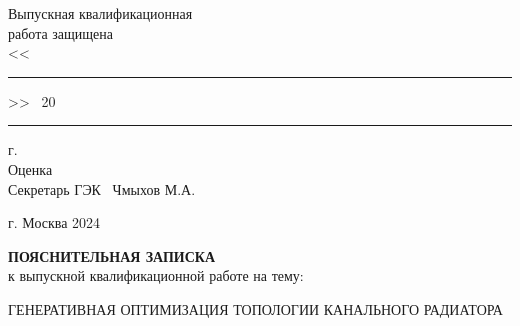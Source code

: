 \documentclass[a4paper,12pt]{extreport}
\numberwithin{equation}{chapter}
\begin{document}
\begin{titlepage}
    \hfill \begin{minipage}[t]{75mm}
        Выпускная квалификационная\\
        работа защищена\\
        <<\rule[0mm]{0.8cm}{0.1mm}>> \hrulefill \ 20\rule[0mm]{0.4cm}{0.1mm} г.\\
        Оценка \hrulefill\\
        Секретарь ГЭК \hrulefill \ Чмыхов М.А.
    \end{minipage}

    \vspace{\fill}

    \begin{center}
        г. Москва 2024
    \end{center}
\end{titlepage}

\newpage
\thispagestyle{empty}
\vspace*{3cm}
\begin{center}
    \Large \textbf{ПОЯСНИТЕЛЬНАЯ ЗАПИСКА} \\
    \large {к выпускной квалификационной работе на тему:}
\end{center}

\vspace{1em}

\begin{center}
    \large ГЕНЕРАТИВНАЯ ОПТИМИЗАЦИЯ ТОПОЛОГИИ КАНАЛЬНОГО РАДИАТОРА
\end{center}

\vspace{5em}
\end{document}
